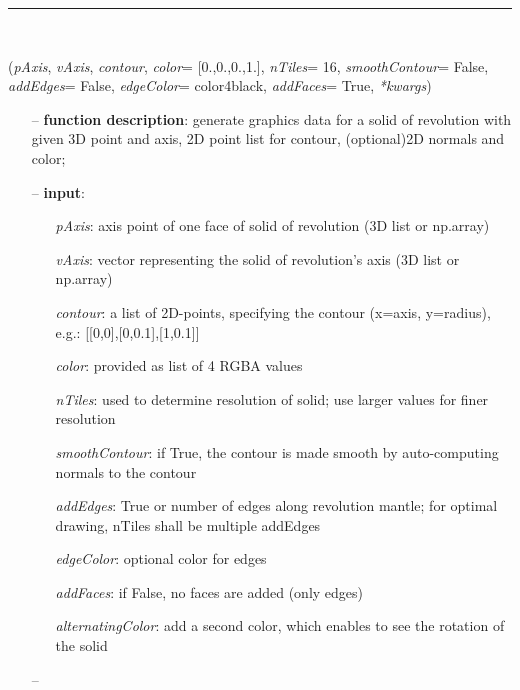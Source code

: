 \begin{itemize}[leftmargin=1.4cm]
\begin{itemize}[leftmargin=1.4cm]
\begin{itemize}[leftmargin=1.4cm]
\begin{itemize}[leftmargin=0.5cm]
\begin{itemize}[leftmargin=1.4cm]
\begin{itemize}[leftmargin=1.4cm]
\begin{itemize}[leftmargin=0.5cm]
\begin{itemize}[leftmargin=1.4cm]
\begin{itemize}[leftmargin=0.5cm]
%
\noindent\rule{8cm}{0.75pt}\vspace{1pt} \\ 
\begin{flushleft}
\label{sec:graphicsDataUtilities:GraphicsDataSolidOfRevolution}
({\it pAxis}, {\it vAxis}, {\it contour}, {\it color}= [0.,0.,0.,1.], {\it nTiles}= 16, {\it smoothContour}= False, {\it addEdges}= False, {\it edgeColor}= color4black, {\it addFaces}= True, {\it **kwargs})
\end{flushleft}
\setlength{\itemindent}{0.7cm}
\begin{itemize}[leftmargin=0.7cm]
\item[--]
{\bf function description}: generate graphics data for a solid of revolution with given 3D point and axis, 2D point list for contour, (optional)2D normals and color;
\item[--]
{\bf input}: \vspace{-6pt}
\begin{itemize}[leftmargin=1.2cm]
\setlength{\itemindent}{-0.7cm}
\item[]{\it pAxis}: axis point of one face of solid of revolution (3D list or np.array)
\item[]{\it vAxis}: vector representing the solid of revolution's axis (3D list or np.array)
\item[]{\it contour}: a list of 2D-points, specifying the contour (x=axis, y=radius), e.g.: [[0,0],[0,0.1],[1,0.1]]
\item[]{\it color}: provided as list of 4 RGBA values
\item[]{\it nTiles}: used to determine resolution of solid; use larger values for finer resolution
\item[]{\it smoothContour}: if True, the contour is made smooth by auto-computing normals to the contour
\item[]{\it addEdges}: True or number of edges along revolution mantle; for optimal drawing, nTiles shall be multiple addEdges
\item[]{\it edgeColor}: optional color for edges
\item[]{\it addFaces}: if False, no faces are added (only edges)
\item[]{\it alternatingColor}: add a second color, which enables to see the rotation of the solid
\end{itemize}
\item[--]

\end{itemize}
\end{itemize}
\end{itemize}
\end{itemize}
\end{itemize}
\end{itemize}
\end{itemize}
\end{itemize}
\end{itemize}
\end{itemize}
